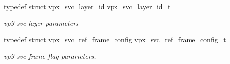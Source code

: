 \begin{DoxyCompactItemize}
typedef struct \hyperlink{structvpx__svc__layer__id}{vpx\+\_\+svc\+\_\+layer\+\_\+id} \hyperlink{group__vp8__encoder_gaba42cb92c1895ae9f7214484c5488cd5}{vpx\+\_\+svc\+\_\+layer\+\_\+id\+\_\+t}
\begin{DoxyCompactList}\small\item\em vp9 svc layer parameters \end{DoxyCompactList}\item 
typedef struct \hyperlink{structvpx__svc__ref__frame__config}{vpx\+\_\+svc\+\_\+ref\+\_\+frame\+\_\+config} \hyperlink{group__vp8__encoder_ga50dc69f110ac04b16478e2db6e89e0db}{vpx\+\_\+svc\+\_\+ref\+\_\+frame\+\_\+config\+\_\+t}
\begin{DoxyCompactList}\small\item\em vp9 svc frame flag parameters. \end{DoxyCompactList}\end{DoxyCompactItemize}
